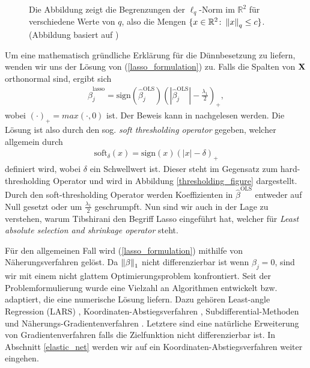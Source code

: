 \begin{figure}
\caption{Die Abbildung zeigt die Begrenzungen der $\ell_q$-Norm im $\mathbb{R}^2$ für verschiedene Werte von $q$, also die Mengen $\{x \in \mathbb{R}^2 \colon \left\lVert x \right\rVert_{q} \leq c \}$. (Abbildung basiert auf \cite{hastie_elements})}
\label{norm_figure}
\end{figure}

Um eine mathematisch gründliche Erklärung für die Dünnbesetzung zu liefern, wenden wir uns der Lösung von (\ref{lasso_formulation}) zu. Falls die Spalten von $\mathbf{X}$ orthonormal sind, ergibt sich
\begin{align}
\hat{\beta}_j^{\text{lasso}} = \text{sign}(\hat{\beta}_j^{\text{OLS}}) \left(\left|\hat{\beta}_j^{\text{OLS}}\right| - \frac{\lambda_1}{2}\right)_{+},
\end{align}
wobei $(\cdot)_+ = max(\cdot, 0)$ ist. Der Beweis kann in \cite{murphy} nachgelesen werden. Die Lösung ist also durch den sog. \textit{soft thresholding operator} gegeben, welcher allgemein durch
\begin{align}
\text{soft}_{\delta}(x) = \text{sign}(x)(|x| - \delta)_+
\end{align}
definiert wird, wobei $\delta$ ein Schwellwert ist. Dieser steht im Gegensatz zum hard-thresholding Operator und wird in Abbildung \ref{thresholding_figure} dargestellt. Durch den soft-thresholding Operator werden Koeffizienten in $\hat{\beta}^{\text{OLS}}$ entweder auf Null gesetzt oder um $\frac{\lambda_1}{2}$ geschrumpft. Nun sind wir auch in der Lage zu verstehen, warum Tibshirani \cite{tibshirani_lasso} den Begriff Lasso eingeführt hat, welcher für \textit{Least absolute selection and shrinkage operator} steht. 

Für den allgemeinen Fall wird (\ref{lasso_formulation}) mithilfe von Näherungsverfahren gelöst. Da $\left\lVert \beta \right\rVert_1$ nicht differenzierbar ist wenn $\beta_j = 0$, sind wir mit einem nicht glattem Optimierungsproblem konfrontiert. Seit der Problemformulierung wurde eine Vielzahl an Algorithmen entwickelt bzw. adaptiert, die eine numerische Lösung liefern. Dazu gehören Least-angle Regression (LARS) \cite{efron_lars}, Koordinaten-Abstiegsverfahren \cite{friedman}, Subdifferential-Methoden und  Näherungs-Gradientenverfahren \cite{yang, vandenberghe}. Letztere sind eine natürliche Erweiterung von Gradientenverfahren falls die Zielfunktion nicht differenzierbar ist. In Abschnitt \ref{elastic_net} werden wir auf ein Koordinaten-Abstiegsverfahren weiter eingehen.

